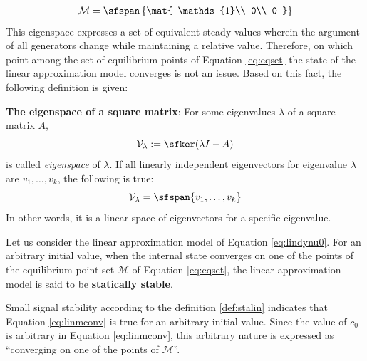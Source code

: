 \documentclass[tombow,dvipdfmx]{corona-a5-1.1}
\begin{document}
\begin{align}\label{eq:eqset}
\mathcal{M} =
 \sfspan\left\{
 \mat{
 \mathds{1}\\
 0\\
 0
 }
 \right\}
\end{align}
This eigenspace expresses a set of equivalent steady values wherein the argument of all generators change while maintaining a relative value.
Therefore, on which point among the set of equilibrium points of Equation \ref{eq:eqset} the state of the linear approximation model converges is not an issue.
Based on this fact, the following definition is given:

\begin{COLUMN}
\noindent \textbf{The eigenspace of a square matrix}:
For some eigenvalues $\lambda$ of a square matrix $A$,
\[
\mathcal{V}_{\lambda}:= \sfker (\lambda I -A)
\]
is called \emph{eigenspace} of $\lambda$. If all linearly independent
eigenvectors for eigenvalue $\lambda$ are $v_1,\ldots,v_k$, the following is
true:
\[
\mathcal{V}_{\lambda} = \sfspan\{v_1,\ldots,v_k\}
\]
In other words, it is a linear space of eigenvectors for a specific eigenvalue.
\end{COLUMN}


\begin{定義}
\label{def:stalin}
Let us consider the linear approximation model of Equation \ref{eq:lindynu0}.
For an arbitrary initial value, when the internal state converges on one of the points of the equilibrium point set $\mathcal{M}$ of Equation \ref{eq:eqset}, the linear approximation model is said to be \textbf{statically stable}.
\end{定義}
Small signal stability according to the definition \ref{def:stalin} indicates that Equation \ref{eq:linmconv} is true for an arbitrary initial value.
Since the value of $c_0$ is arbitrary in Equation \ref{eq:linmconv}, this arbitrary nature is expressed as “converging on one of the points of $\mathcal{M}$”.
\end{document}
